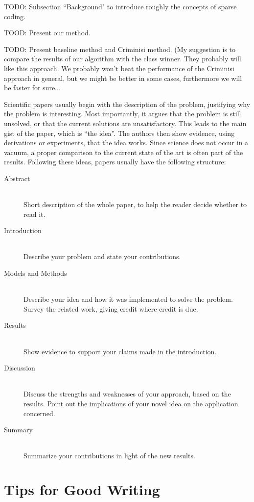 TODO: Subsection ``Background" to introduce roughly the concepts of sparse coding.

TOOD: Present our method.

TODO: Present baseline method and Criminisi method. (My suggestion is to compare the results of our algorithm with the class winner. They probably will like this approach. We probably won't beat the performance of the Criminisi approach in general, but we might be better in some cases, furthermore we will be faster for sure...

Scientific papers usually begin with the description of the problem,
justifying why the problem is interesting. Most importantly, it argues
that the problem is still unsolved, or that the current solutions are
unsatisfactory. This leads to the main gist of the paper, which is
``the idea''. The authors then show evidence, using derivations or
experiments, that the idea works. Since science does not occur in a
vacuum, a proper comparison to the current state of the art is often
part of the results. Following these ideas, papers usually have the
following structure:
\begin{description}
\item[Abstract] \ \\
  Short description of the whole paper, to help the
  reader decide whether to read it.
\item[Introduction] \ \\
  Describe your problem and state your
  contributions.
\item[Models and Methods] \ \\
  Describe your idea and how it was implemented to solve
  the problem. Survey the related work, giving credit where credit is
  due.
\item[Results] \ \\
  Show evidence to support your claims made in the
  introduction.
\item[Discussion] \ \\
  Discuss the strengths and weaknesses of your
  approach, based on the results. Point out the implications of your
  novel idea on the application concerned.
\item[Summary] \ \\
  Summarize your contributions in light of the new
  results.
\end{description}


\section{Tips for Good Writing}
\label{sec:tips-writing}

